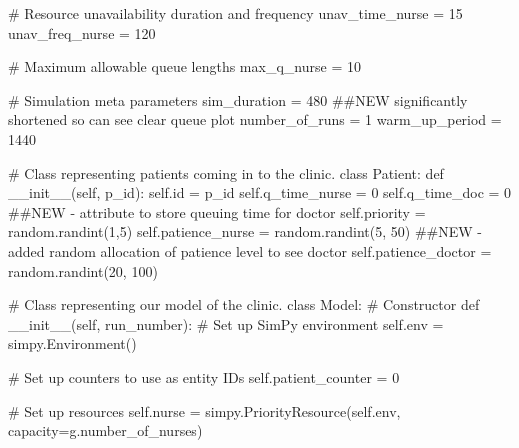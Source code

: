 \documentclass[
  letterpaper,
  DIV=11,
  numbers=noendperiod]{scrreprt}
\newenvironment{Shaded}{\begin{snugshade}}{\end{snugshade}}
\newcommand{\BuiltInTok}[1]{\textcolor[rgb]{0.00,0.23,0.31}{#1}}
\newcommand{\CommentTok}[1]{\textcolor[rgb]{0.37,0.37,0.37}{#1}}
\newcommand{\DecValTok}[1]{\textcolor[rgb]{0.68,0.00,0.00}{#1}}
\newcommand{\FunctionTok}[1]{\textcolor[rgb]{0.28,0.35,0.67}{#1}}
\newcommand{\KeywordTok}[1]{\textcolor[rgb]{0.00,0.23,0.31}{#1}}
\newcommand{\NormalTok}[1]{\textcolor[rgb]{0.00,0.23,0.31}{#1}}
\newcommand{\OperatorTok}[1]{\textcolor[rgb]{0.37,0.37,0.37}{#1}}
\newcommand{\VariableTok}[1]{\textcolor[rgb]{0.07,0.07,0.07}{#1}}
\begin{document}
\begin{tcolorbox}
\begin{Shaded}
\begin{Highlighting}[]
    \CommentTok{\# Resource unavailability duration and frequency}
\NormalTok{    unav\_time\_nurse }\OperatorTok{=} \DecValTok{15}
\NormalTok{    unav\_freq\_nurse }\OperatorTok{=} \DecValTok{120}

    \CommentTok{\# Maximum allowable queue lengths}
\NormalTok{    max\_q\_nurse }\OperatorTok{=} \DecValTok{10}

    \CommentTok{\# Simulation meta parameters}
\NormalTok{    sim\_duration }\OperatorTok{=} \DecValTok{480} \CommentTok{\#\#NEW significantly shortened so can see clear queue plot}
\NormalTok{    number\_of\_runs }\OperatorTok{=} \DecValTok{1}
\NormalTok{    warm\_up\_period }\OperatorTok{=} \DecValTok{1440}

\CommentTok{\# Class representing patients coming in to the clinic.}
\KeywordTok{class}\NormalTok{ Patient:}
    \KeywordTok{def} \FunctionTok{\_\_init\_\_}\NormalTok{(}\VariableTok{self}\NormalTok{, p\_id):}
        \VariableTok{self}\NormalTok{.}\BuiltInTok{id} \OperatorTok{=}\NormalTok{ p\_id}
        \VariableTok{self}\NormalTok{.q\_time\_nurse }\OperatorTok{=} \DecValTok{0}
        \VariableTok{self}\NormalTok{.q\_time\_doc }\OperatorTok{=} \DecValTok{0} \CommentTok{\#\#NEW {-} attribute to store queuing time for doctor}
        \VariableTok{self}\NormalTok{.priority }\OperatorTok{=}\NormalTok{ random.randint(}\DecValTok{1}\NormalTok{,}\DecValTok{5}\NormalTok{)}
        \VariableTok{self}\NormalTok{.patience\_nurse }\OperatorTok{=}\NormalTok{ random.randint(}\DecValTok{5}\NormalTok{, }\DecValTok{50}\NormalTok{)}
        \CommentTok{\#\#NEW {-} added random allocation of patience level to see doctor}
        \VariableTok{self}\NormalTok{.patience\_doctor }\OperatorTok{=}\NormalTok{ random.randint(}\DecValTok{20}\NormalTok{, }\DecValTok{100}\NormalTok{)}

\CommentTok{\# Class representing our model of the clinic.}
\KeywordTok{class}\NormalTok{ Model:}
    \CommentTok{\# Constructor}
    \KeywordTok{def} \FunctionTok{\_\_init\_\_}\NormalTok{(}\VariableTok{self}\NormalTok{, run\_number):}
        \CommentTok{\# Set up SimPy environment}
        \VariableTok{self}\NormalTok{.env }\OperatorTok{=}\NormalTok{ simpy.Environment()}

        \CommentTok{\# Set up counters to use as entity IDs}
        \VariableTok{self}\NormalTok{.patient\_counter }\OperatorTok{=} \DecValTok{0}

        \CommentTok{\# Set up resources}
        \VariableTok{self}\NormalTok{.nurse }\OperatorTok{=}\NormalTok{ simpy.PriorityResource(}\VariableTok{self}\NormalTok{.env,}
\NormalTok{                                            capacity}\OperatorTok{=}\NormalTok{g.number\_of\_nurses)}


\end{Highlighting}
\end{Shaded}
\end{tcolorbox}
\end{document}
